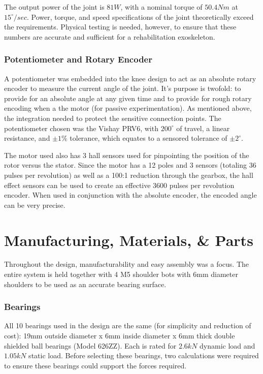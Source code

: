 The output power of the joint is \(81 W\), with a nominal torque of \(50.4 Nm\) at \(15^\circ/sec\). Power, torque, and speed specifications of the joint theoretically exceed the requirements. Physical testing is needed, however, to ensure that these numbers are accurate and sufficient for a rehabilitation exoskeleton.
 
\subsubsection{Potentiometer and Rotary Encoder}
A potentiometer was embedded into the knee design to act as an absolute rotary encoder to measure the current angle of the joint. It's purpose is twofold: to provide for an absolute angle at any given time and to provide for rough rotary encoding when a the motor (for passive experimentation). As mentioned above, the integration needed to protect the sensitive connection points. The potentiometer chosen was the Vishay PRV6, with \(200^\circ\) of travel, a linear resistance, and \(\pm 1\%\) tolerance, which equates to a sensored tolerance of \(\pm 2^\circ\). 

The motor used also has 3 hall sensors used for pinpointing the position of the rotor versus the stator. Since the motor has a 12 poles and 3 sensors (totaling 36 pulses per revolution) as well as a 100:1 reduction through the gearbox, the hall effect sensors can be used to create an effective 3600 pulses per revolution encoder. When used in conjunction with the absolute encoder, the encoded angle can be very precise.


\section{Manufacturing, Materials, \& Parts}
Throughout the design, manufacturability and easy assembly was a focus. The entire system is held together with 4 M5 shoulder bots with 6mm diameter shoulders to be used as an accurate bearing surface.

\subsubsection{Bearings}
\label{sec:BearingsAndCalcs}
All 10 bearings used in the design are the same (for simplicity and reduction of cost): 19mm outside diameter x 6mm inside diameter x 6mm thick double shielded ball bearings (Model 626ZZ). Each is rated for \(2.6kN\) dynamic load and \(1.05kN\) static load. Before selecting these bearings, two calculations were required to ensure these bearings could support the forces required.

